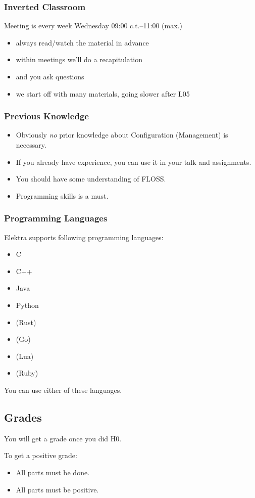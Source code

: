 \begin{frame}
	\frametitle{Inverted Classroom}
	Meeting is every week Wednesday 09:00 c.t.--11:00 (max.)

	\begin{itemize}[<+->]
		\item always read/watch the material in advance
		\item within meetings we'll do a recapitulation
		\item and you ask questions
		\item we start off with many materials, going slower after L05
	\end{itemize}
\end{frame}

\begin{frame}
	\frametitle{Previous Knowledge}
	\begin{itemize}[<+->]
		\item Obviously \textit{no} prior knowledge about Configuration (Management) is necessary.
		\item If you already have experience, you can use it in your talk and assignments.
		\item You should have some understanding of FLOSS.
		\item Programming skills is a must.
	\end{itemize}
\end{frame}

\begin{frame}
	\frametitle{Programming Languages}
	Elektra supports following programming languages:
	\begin{itemize}
		\item C
		\item C++
		\item Java
		\item Python
		\item (Rust)
		\item (Go)
		\item (Lua)
		\item (Ruby)
	\end{itemize}
	You can use either of these languages.
\end{frame}

\subsection{Grades}

\begin{frame}
	You will get a grade once you did H0.
	\vspace{1cm}

	To get a positive grade:
	\begin{itemize}
		\item All parts must be done.
		\item All parts must be positive.
	\end{itemize}
\end{frame}

